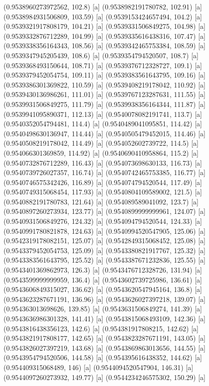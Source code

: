 {{{(0.9538960273972562, 102.8) [a] 
(0.9538982191780782, 102.91) [a] 
(0.9538984931506809, 103.59) [a] 
(0.9539153424657494, 104.2) [a] 
(0.9539321917808179, 104.21) [a] 
(0.9539331506849275, 104.98) [a] 
(0.9539332876712289, 104.99) [a] 
(0.9539335616438316, 107.47) [a] 
(0.9539338356164343, 108.56) [a] 
(0.9539342465753384, 108.59) [a] 
(0.9539347945205439, 108.6) [a] 
(0.9539354794520507, 108.7) [a] 
(0.9539368493150644, 108.71) [a] 
(0.9539376712328727, 109.1) [a] 
(0.9539379452054754, 109.11) [a] 
(0.9539383561643795, 109.16) [a] 
(0.9539386301369822, 110.59) [a] 
(0.9539408219178042, 110.92) [a] 
(0.9539430136986261, 111.01) [a] 
(0.9539767123287631, 111.55) [a] 
(0.9539931506849275, 111.79) [a] 
(0.9539938356164344, 111.87) [a] 
(0.9539941095890371, 112.13) [a] 
(0.9540078082191741, 113.7) [a] 
(0.9540352054794481, 114.4) [a] 
(0.9540489041095851, 114.42) [a] 
(0.9540498630136947, 114.44) [a] 
(0.9540505479452015, 114.46) [a] 
(0.9540508219178042, 114.49) [a] 
(0.954052602739722, 114.5) [a] 
(0.954066301369859, 114.92) [a] 
(0.9540690410958864, 115.2) [a] 
(0.9540732876712289, 116.43) [a] 
(0.954073698630133, 116.73) [a] 
(0.9540739726027357, 116.74) [a] 
(0.9540742465753385, 116.77) [a] 
(0.9540746575342426, 116.89) [a] 
(0.954074794520544, 117.49) [a] 
(0.9540749315068454, 117.93) [a] 
(0.9540804109589002, 121.5) [a] 
(0.9540882191780783, 121.64) [a] 
(0.954089589041092, 123.7) [a] 
(0.9540897260273934, 123.77) [a] 
(0.9540899999999961, 124.07) [a] 
(0.9540931506849276, 124.32) [a] 
(0.954094794520544, 124.33) [a] 
(0.9540991780821878, 124.63) [a] 
(0.9540994520547905, 125.06) [a] 
(0.9542319178082151, 125.07) [a] 
(0.9542849315068452, 125.08) [a] 
(0.9543379452054753, 125.09) [a] 
(0.9543380821917767, 125.32) [a] 
(0.9543383561643795, 125.52) [a] 
(0.9543387671232836, 125.55) [a] 
(0.9543401369862973, 126.3) [a] 
(0.9543476712328726, 131.94) [a] 
(0.9543599999999959, 136.4) [a] 
(0.9543602739725986, 136.61) [a] 
(0.9543606849315027, 136.62) [a] 
(0.9543620547945164, 136.8) [a] 
(0.9543623287671191, 136.96) [a] 
(0.9543626027397218, 139.07) [a] 
(0.954363013698626, 139.85) [a] 
(0.9543631506849274, 141.39) [a] 
(0.9543636986301328, 141.41) [a] 
(0.9543815068493109, 142.36) [a] 
(0.9543816438356123, 142.6) [a] 
(0.954381917808215, 142.62) [a] 
(0.9543821917808177, 142.65) [a] 
(0.9543823287671191, 143.05) [a] 
(0.9543826027397219, 143.68) [a] 
(0.9543869863013656, 144.55) [a] 
(0.9543954794520506, 144.58) [a] 
(0.954395616438352, 144.62) [a] 
(0.954409315068489, 146) [a] 
(0.9544094520547904, 146.31) [a] 
(0.9544097260273932, 149.77) [a] 
(0.9544234246575302, 150.29) [a] 
}}}
